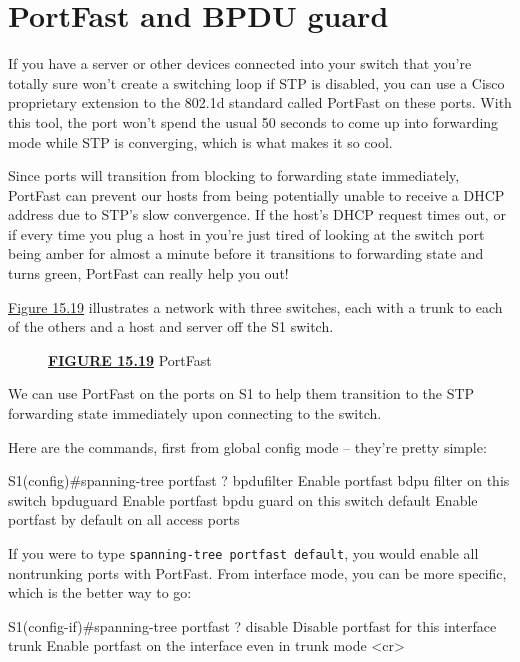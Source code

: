 \section{PortFast and BPDU guard}

If you have a server or other devices connected into your switch that
you're totally sure won't create a switching loop if STP is disabled,
you can use a Cisco proprietary extension to the 802.1d standard called
PortFast on these ports. With this tool, the port won't spend
the usual 50 seconds
to come up into forwarding mode while STP is converging, which is what
makes it so cool.

Since ports will transition from blocking to forwarding state
immediately, PortFast can prevent our hosts from being potentially
unable to receive a DHCP address due to STP's slow convergence. If the
host's DHCP request times out, or if every time you plug a host in
you're just tired of looking at the switch port being amber for almost a
minute before it transitions to forwarding state and turns green,
PortFast can really help you out!

\protect\hyperlink{c15.xhtmlux5cux23figure15-19}{Figure 15.19}
illustrates a network with three switches, each with a trunk to each of
the others and a host and server off the S1 switch.

\begin{figure}
\centering
\caption{{\protect\hyperlink{c15.xhtmlux5cux23figureanchor15-19}{\textbf{FIGURE
15.19}} PortFast}}
\end{figure}

We can use PortFast on the ports on S1 to help them transition to the
STP forwarding state immediately upon connecting to the switch.

Here are the commands, first from global config mode -- they're pretty
simple:

\begin{cli}
S1(config)#spanning-tree portfast ?
  bpdufilter  Enable portfast bdpu filter on this switch
  bpduguard   Enable portfast bpdu guard on this switch
  default     Enable portfast by default on all access ports
\end{cli}

If you were to type \texttt{spanning-tree\ portfast\ default}, you would
enable all nontrunking ports with PortFast. From interface mode, you can
be more specific, which is the better way to go:

\begin{cli}
S1(config-if)#spanning-tree portfast ?
  disable  Disable portfast for this interface
  trunk    Enable portfast on the interface even in trunk mode
  <cr>
\end{cli}

